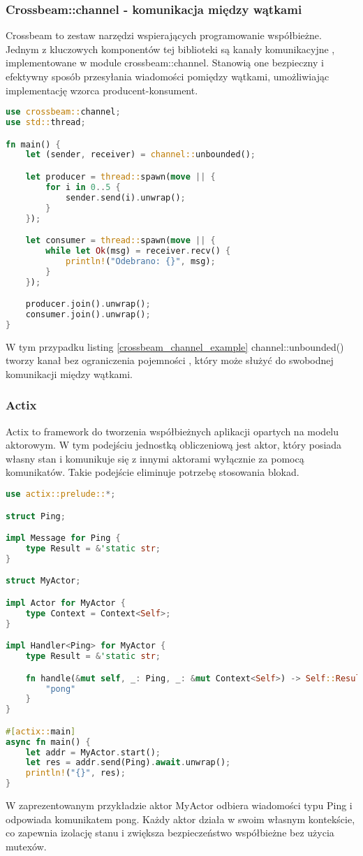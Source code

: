 \subsubsection{Crossbeam::channel - komunikacja między wątkami}
Crossbeam to zestaw narzędzi wspierających programowanie współbieżne. Jednym z kluczowych komponentów tej biblioteki są kanały komunikacyjne , implementowane w module crossbeam::channel. Stanowią one bezpieczny i efektywny sposób przesyłania wiadomości pomiędzy wątkami, umożliwiając implementację wzorca producent-konsument.

\begin{lstlisting}[language=Rust, caption=Przykład użycia kanałów Crossbeam, label=crossbeam_channel_example]
use crossbeam::channel;
use std::thread;

fn main() {
    let (sender, receiver) = channel::unbounded();

    let producer = thread::spawn(move || {
        for i in 0..5 {
            sender.send(i).unwrap();
        }
    });

    let consumer = thread::spawn(move || {
        while let Ok(msg) = receiver.recv() {
            println!("Odebrano: {}", msg);
        }
    });

    producer.join().unwrap();
    consumer.join().unwrap();
}
\end{lstlisting}
W tym przypadku listing \ref{crossbeam_channel_example} channel::unbounded() tworzy kanał bez ograniczenia pojemności , który może służyć do swobodnej komunikacji między wątkami.
\subsubsection{Actix}
Actix to framework do tworzenia współbieżnych aplikacji opartych na modelu aktorowym. W tym podejściu jednostką obliczeniową jest aktor, który posiada własny stan i komunikuje się z innymi aktorami wyłącznie za pomocą komunikatów. Takie podejście eliminuje potrzebę stosowania blokad.
\begin{lstlisting}[language=Rust, caption=Przykład użycia Actix, label=actix_example]
use actix::prelude::*;

struct Ping;

impl Message for Ping {
    type Result = &'static str;
}

struct MyActor;

impl Actor for MyActor {
    type Context = Context<Self>;
}

impl Handler<Ping> for MyActor {
    type Result = &'static str;

    fn handle(&mut self, _: Ping, _: &mut Context<Self>) -> Self::Result {
        "pong"
    }
}

#[actix::main]
async fn main() {
    let addr = MyActor.start();
    let res = addr.send(Ping).await.unwrap();
    println!("{}", res);
}
\end{lstlisting}
W zaprezentowanym przykładzie aktor MyActor odbiera wiadomości typu Ping i odpowiada komunikatem pong. Każdy aktor działa w swoim własnym kontekście, co zapewnia izolację stanu i zwiększa bezpieczeństwo współbieżne bez użycia mutexów.

